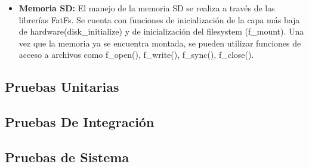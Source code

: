 \begin{itemize}
	\item \textbf{Memoria SD:} El manejo de la memoria SD se realiza a través de las librerías FatFs. Se cuenta con funciones de inicialización de la capa más baja de hardware(disk\_initialize) y de inicialización del filesystem (f\_mount). Una vez que la memoria ya se encuentra montada, se pueden utilizar funciones de acceso a archivos como f\_open(), f\_write(), f\_sync(), f\_close().

\end{itemize}



\subsection{Pruebas Unitarias} \label{pruebasUnitarias}
\subsection{Pruebas De Integración} \label{pruebasIntegracion}
\subsection{Pruebas de Sistema} \label{pruebasSistema}






